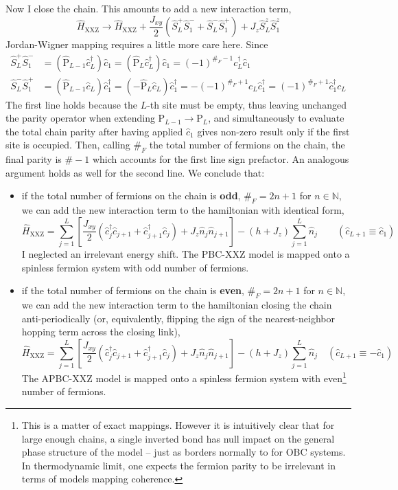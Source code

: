 Now I close the chain. This amounts to add a new interaction term,
\[
	\hat H_\mathrm{XXZ} \to \hat H_\mathrm{XXZ} + \frac{J_{xy}}{2} \left( 
		\hat S_L^+ \hat S_1^- + \hat S_L^- \hat S_1^+
	\right) + J_z \hat S_L^z \hat S_1^z
\]
Jordan-Wigner mapping requires a little more care here. Since
\[
	\begin{aligned}
		\hat S_L^+ \hat S_1^- &= \left(
			\hat{\mathrm{P}}_{L-1} \hat c_L^\dagger
		\right) \hat c_1 = \left(
			\hat{\mathrm{P}}_L \hat c_L^\dagger
		\right) \hat c_1 = (-1)^{\#_F -1} c_L^\dagger \hat c_1 \\
		\hat S_L^- \hat S_1^+ &= \left(
			\hat{\mathrm{P}}_{L-1} \hat c_L
		\right) \hat c_1^\dagger = \left(
			-\hat{\mathrm{P}}_L \hat c_L
		\right) \hat c_1^\dagger = -(-1)^{\#_F+1} c_L \hat c_1^\dagger = (-1)^{\#_F+1} \hat c_1^\dagger c_L
	\end{aligned}
\]
The first line holds because the $L$-th site must be empty, thus leaving unchanged the parity operator when extending $\mathrm{P}_{L-1} \to \mathrm{P}_L$, and simultaneously to evaluate the total chain parity after having applied $\hat c_1$ gives non-zero result only if the first site is occupied. Then, calling $\#_F$ the total number of fermions on the chain, the final parity is $\#-1$ which accounts for the first line sign prefactor. An analogous argument holds as well for the second line. We conclude that:
\begin{itemize}
	\item if the total number of fermions on the chain is \textbf{odd}, $\#_F = 2n+1$ for $n \in \mathbb{N}$, we can add the new interaction term to the hamiltonian with identical form,
	\begin{equation}\label{eq:xxz-hamiltonian-intermediate}
		\hat H_\mathrm{XXZ} = \sum_{j=1}^L \left[
			\frac{J_{xy}}{2} \left(
				\hat c_j^\dagger \hat c_{j+1} + \hat c_{j+1}^\dagger \hat c_j
			\right) + J_z \hat n_j \hat n_{j+1}
		\right] - (h+J_z) \sum_{j=1}^L \hat n_{j}
		\qquad
		\left(
			\hat c_{L+1} \equiv \hat c_1
		\right)
	\end{equation}
	I neglected an irrelevant energy shift. The PBC-$\mathrm{XXZ}$ model is mapped onto a spinless fermion system with odd number of fermions.
	\item if the total number of fermions on the chain is \textbf{even}, $\#_F = 2n+1$ for $n \in \mathbb{N}$, we can add the new interaction term to the hamiltonian closing the chain anti-periodically (or, equivalently, flipping the sign of the nearest-neighbor hopping term across the closing link),
	\[
		\hat H_\mathrm{XXZ} = \sum_{j=1}^L \left[
		\frac{J_{xy}}{2} \left(
				\hat c_j^\dagger \hat c_{j+1} + \hat c_{j+1}^\dagger \hat c_j
			\right) + J_z \hat n_j \hat n_{j+1}
		\right] - (h+J_z) \sum_{j=1}^L \hat n_{j}
		\quad
		\left(
			\hat c_{L+1} \equiv - \hat c_1
		\right)
	\]
	The APBC-$\mathrm{XXZ}$ model is mapped onto a spinless fermion system with even\footnote{
		This is a matter of exact mappings. However it is intuitively clear that for large enough chains, a single inverted bond has null impact on the general phase structure of the model -- just as borders normally to for OBC systems. In thermodynamic limit, one expects the fermion parity to be irrelevant in terms of models mapping coherence.
	} number of fermions.
\end{itemize}
